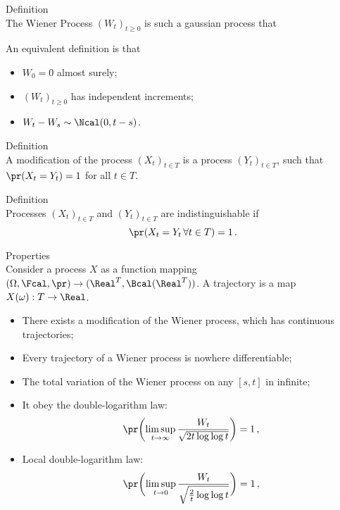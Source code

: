 \noindent Definition \hfill\\
The Wiener Process $(W_t)_{t\geq 0}$ is such a gaussian process that \begin{itemize}
	\item $\ex W_t = 0$;
	\item $\cov(W_t, W_s) = \min\{\s,t}$ for any $t,s\geq 0$.
\end{itemize}
An equivalent definition is that \begin{itemize}
	\item $W_0=0$ almost surely;
	\item $(W_t)_{t\geq 0}$ has independent increments;
	\item $W_t-W_s\sim\Ncal(0, t-s)$.
\end{itemize}

\noindent Definition  \hfill\\
A modification of the process $(X_t)_{t\in T}$ is a process $(Y_t)_{t\in T}$,
such that $\pr(X_t=Y_t)=1$ for all $t\in T$.

\noindent Definition  \hfill\\
Processes $(X_t)_{t\in T}$ and $(Y_t)_{t\in T}$ are indistinguishable if 
\[ \pr(X_t=Y_t\,\forall t\in T )=1 \,. \]

\noindent Properties \hfill\\
Consider a process $X$ as a function mapping $(\Omega, \Fcal, \pr) \to (\Real^T, \Bcal(\Real^T))$.
A trajectory is a map $X(\omega): T \to \Real$.
\begin{itemize}
	\item There exists a modification of the Wiener process, which has continuous
	trajectories;
	\item Every trajectory of a Wiener process is nowhere differentiable;
	\item The total variation of the Wiener process on any $[s,t]$ in infinite;
	\item It obey the double-logarithm law:
		\[\pr\biggl( \limsup_{t\to\infty} \frac{W_t}{\sqrt{ 2t \log\log t }} \biggr) = 1 \,, \]
	\item Local double-logarithm law:
		\[\pr\biggl( \limsup_{t\to0} \frac{W_t}{\sqrt{ \frac{2}{t}\log\log t }} \biggr) = 1 \,, \]
\end{itemize}

